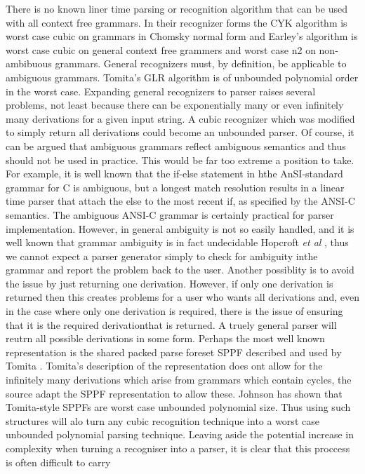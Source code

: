 \begin{isabellebody}
\begin{isamarkuptext}
There is no known liner time parsing or recognition algorithm that can be used with all context free grammars.
In their recognizer forms the CYK algorithm is worst case cubic on grammars in Chomsky normal form and Earley's
algorithm is worst case cubic on general context free grammers and worst case n2 on non-ambibuous grammars.
General recognizers must, by definition, be applicable to ambiguous grammars. Tomita's GLR algorithm is of unbounded
polynomial order in the worst case. Expanding general recognizers to parser raises several problems, not least
because there can be exponentially many or even infinitely many derivations for a given input string. A cubic
recognizer which was modified to simply return all derivations could become an unbounded parser.
Of course, it can be argued that ambiguous grammars reflect ambiguous semantics and thus should not be used in
practice. This would be far too extreme a position to take. For example, it is well known that the if-else
statement in hthe AnSI-standard grammar for C is ambiguous, but a longest match resolution results in a linear
time parser that attach the else to the most recent if, as specified by the ANSI-C semantics. The ambiguous
ANSI-C grammar is certainly practical for parser implementation. However, in general ambiguity is not so easily handled,
and it is well known that grammar ambiguity is in fact undecidable Hopcroft \textit{et al} \cite{Hopcroft:2006}, thus
we cannot expect a parser generator simply to check for ambiguity inthe grammar and report the problem back to the user.
Another possiblity is to avoid the issue by just returning one derivation. However, if only one derivation is returned
then this creates problems for a user who wants all derivations and, even in the case where only one derivation is
required, there is the issue of ensuring that it is the required derivationthat is returned. A truely general parser
will reutrn all possible derivations in some form. Perhaps the most well known representation is the shared packed
parse foreset SPPF described and used by Tomita \cite{Tomita:1985}. Tomita's description of the representation does ont allow
for the infinitely many derivations which arise from grammars which contain cycles, the source adapt the SPPF representation
to allow these. Johnson \cite{Johnson:1991} has shown that Tomita-style SPPFs are worst case unbounded polynomial size. Thus
using such structures will alo turn any cubic recognition technique into a worst case unbounded polynomial parsing technique.
Leaving aside the potential increase in complexity when turning a recogniser into a parser, it is clear that this proccess is often difficult to carry

\end{isamarkuptext}
\end{isabellebody}
